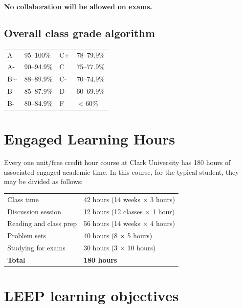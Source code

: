 \documentclass[11pt]{article}
\newcommand{\ul}[1]{\underline{#1}}
\begin{document}
\textbf{\ul{No} collaboration will be allowed on exams.}

\subsection{Overall class grade algorithm}\hspace{0pt}\par
\vspace{0.3em}
\begin{tabular}{@{}ll@{\hspace{3em}}ll@{}}
\toprule
A  & 95--100\%   & C+ & 78--79.9\% \\
A- & 90--94.9\%  & C  & 75--77.9\% \\
B+ & 88--89.9\%  & C- & 70--74.9\% \\
B  & 85--87.9\%  & D  & 60--69.9\% \\
B- & 80--84.9\%  & F  & $<$60\% \\
\bottomrule
\end{tabular}

\section{Engaged Learning Hours}

Every one unit/free credit hour course at Clark University has 180 hours of
associated engaged academic time. In this course, for the typical student, they
may be divided as follows:

\vspace{0.3em}
\begin{tabular}{@{}ll@{}}
\toprule
Class time            & 42 hours (14 weeks $\times$ 3 hours) \\
Discussion session    & 12 hours (12 classes $\times$ 1 hour) \\
Reading and class prep& 56 hours (14 weeks $\times$ 4 hours) \\
Problem sets          & 40 hours (8 $\times$ 5 hours) \\
Studying for exams    & 30 hours (3 $\times$ 10 hours) \\
\midrule
\textbf{Total}        & \textbf{180 hours} \\
\bottomrule
\end{tabular}

\section{LEEP learning objectives}
\end{document}
